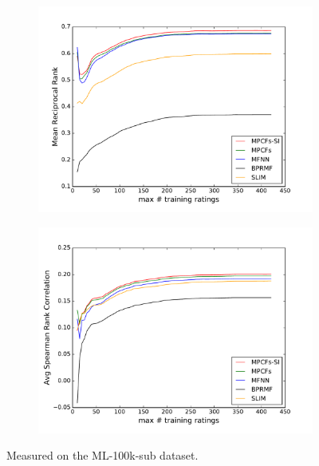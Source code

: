 \begin{figure}
\begin{subfigure}[b]{0.46\linewidth}
		\includegraphics[width=\linewidth]{./section-chapter2/figures/ml-100k_comparison_mrr.pdf}
	\end{subfigure}
	\begin{subfigure}[b]{0.46\linewidth}
		\includegraphics[width=\linewidth]{./section-chapter2/figures/ml-100k_comparison_src.pdf}
	\end{subfigure}
	
	\caption{Measured on the ML-100k-sub dataset.}
	\label{f:ml-100k-comp-group}
\end{figure}


